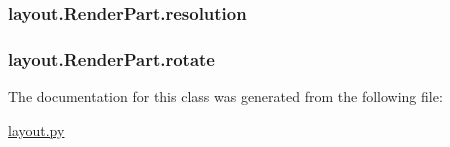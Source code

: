\subsubsection[{resolution}]{\setlength{\rightskip}{0pt plus 5cm}layout.\+Render\+Part.\+resolution}\label{classlayout_1_1_render_part_a6f1175809def8c95002868cdac53f687}
\hypertarget{classlayout_1_1_render_part_a7854669838d9409538a941905861168b}{}
\subsubsection[{rotate}]{\setlength{\rightskip}{0pt plus 5cm}layout.\+Render\+Part.\+rotate}\label{classlayout_1_1_render_part_a7854669838d9409538a941905861168b}


The documentation for this class was generated from the following file\+:\begin{DoxyCompactItemize}
\item 
\hyperlink{layout_8py}{layout.\+py}\end{DoxyCompactItemize}
